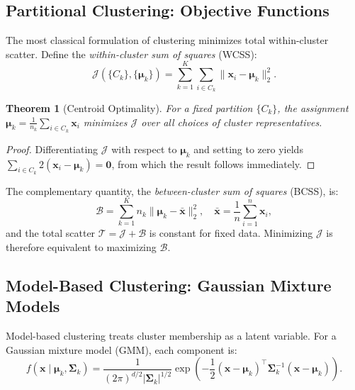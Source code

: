 \documentclass[conference]{IEEEtran}
\newtheorem{theorem}{Theorem}
\begin{document}
\subsection{Partitional Clustering: Objective Functions}

The most classical formulation of clustering minimizes total within-cluster scatter. Define the \emph{within-cluster sum of squares} (WCSS):
\begin{equation}
\mathcal{J}(\{C_k\}, \{\boldsymbol{\mu}_k\}) = \sum_{k=1}^K \sum_{i \in C_k} \|\mathbf{x}_i - \boldsymbol{\mu}_k\|_2^2.
\label{eq:wcss}
\end{equation}

\begin{theorem}[Centroid Optimality]
For a fixed partition $\{C_k\}$, the assignment $\boldsymbol{\mu}_k = \frac{1}{n_k}\sum_{i \in C_k}\mathbf{x}_i$ minimizes $\mathcal{J}$ over all choices of cluster representatives.
\end{theorem}
\begin{proof}
Differentiating $\mathcal{J}$ with respect to $\boldsymbol{\mu}_k$ and setting to zero yields $\sum_{i \in C_k} 2(\mathbf{x}_i - \boldsymbol{\mu}_k) = \mathbf{0}$, from which the result follows immediately.
\end{proof}

The complementary quantity, the \emph{between-cluster sum of squares} (BCSS), is:
\begin{equation}
\mathcal{B} = \sum_{k=1}^K n_k \|\boldsymbol{\mu}_k - \bar{\mathbf{x}}\|_2^2, \quad \bar{\mathbf{x}} = \frac{1}{n}\sum_{i=1}^n \mathbf{x}_i,
\end{equation}
and the total scatter $\mathcal{T} = \mathcal{J} + \mathcal{B}$ is constant for fixed data. Minimizing $\mathcal{J}$ is therefore equivalent to maximizing $\mathcal{B}$.

\subsection{Model-Based Clustering: Gaussian Mixture Models}

Model-based clustering \cite{fraley2002model} treats cluster membership as a latent variable. For a Gaussian mixture model (GMM), each component is:
\begin{equation}
f(\mathbf{x} \mid \boldsymbol{\mu}_k, \boldsymbol{\Sigma}_k) = \frac{1}{(2\pi)^{d/2}|\boldsymbol{\Sigma}_k|^{1/2}} \exp\!\left(-\frac{1}{2}(\mathbf{x}-\boldsymbol{\mu}_k)^\top \boldsymbol{\Sigma}_k^{-1}(\mathbf{x}-\boldsymbol{\mu}_k)\right).
\end{equation}
\end{document}
